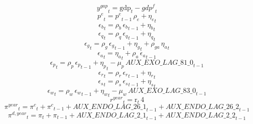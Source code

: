 \begin{dmath}
{{y^{gap}}}_{t}={{\mathrm{gdp}}}_{t}-{{gdp^{f}}}_{t}
\end{dmath}
\begin{dmath}
{{p^{e}}}_{t}={{p^{e}}}_{t-1}\, {{\rho_{e}}}+{{\eta_{e}}}_{t}
\end{dmath}
\begin{dmath}
{{\epsilon_{b}}}_{t}={{\rho_{b}}}\, {{\epsilon_{b}}}_{t-1}+{{\eta_{b}}}_{t}
\end{dmath}
\begin{dmath}
{{\epsilon_{q}}}_{t}={{\rho_{q}}}\, {{\epsilon_{q}}}_{t-1}+{{\eta_{q}}}_{t}
\end{dmath}
\begin{dmath}
{{\epsilon_{g}}}_{t}={{\rho_{g}}}\, {{\epsilon_{g}}}_{t-1}+{{\eta_{g}}}_{t}+{{\rho_{ga}}}\, {{\eta_{a}}}_{t}
\end{dmath}
\begin{dmath}
{{\epsilon_{a}}}_{t}={{\eta_{a}}}_{t}+{{\rho_{a}}}\, {{\epsilon_{a}}}_{t-1}
\end{dmath}
\begin{dmath}
{{\epsilon_{p}}}_{t}={{\rho_{p}}}\, {{\epsilon_{p}}}_{t-1}+{{\eta_{p}}}_{t}-{{\mu_{p}}}\, {AUX\_EXO\_LAG\_81\_0}_{t-1}
\end{dmath}
\begin{dmath}
{{\epsilon_{r}}}_{t}={{\rho_{r}}}\, {{\epsilon_{r}}}_{t-1}+{{\eta_{r}}}_{t}
\end{dmath}
\begin{dmath}
{{\epsilon_{s}}}_{t}={{\rho_{s}}}\, {{\epsilon_{s}}}_{t-1}+{{\eta_{s}}}_{t}
\end{dmath}
\begin{dmath}
{{\epsilon_{w}}}_{t}={{\rho_{w}}}\, {{\epsilon_{w}}}_{t-1}+{{\eta_{w}}}_{t}-{{\mu_{w}}}\, {AUX\_EXO\_LAG\_83\_0}_{t-1}
\end{dmath}
\begin{dmath}
{{r^{year}}}_{t}={{\mathrm{r}}}_{t}\, 4
\end{dmath}
\begin{dmath}
{{\pi^{year}}}_{t}={{\pi^{c}}}_{t}+{{\pi^{c}}}_{t-1}+{AUX\_ENDO\_LAG\_26\_1}_{t-1}+{AUX\_ENDO\_LAG\_26\_2}_{t-1}
\end{dmath}
\begin{dmath}
{{\pi^{d,year}}}_{t}={{\pi}}_{t}+{{\pi}}_{t-1}+{AUX\_ENDO\_LAG\_2\_1}_{t-1}+{AUX\_ENDO\_LAG\_2\_2}_{t-1}
\end{dmath}
